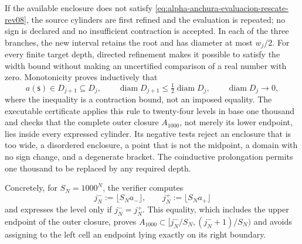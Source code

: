 If the available enclosure does not satisfy
\eqref{eq:alpha-anchura-evaluacion-rescate-rev08}, the source cylinders are
first refined and the evaluation is repeated; no sign is declared and no
insufficient contraction is accepted. In each of the three branches, the new
interval retains the root and has diameter at most \(w_j/2\). For every
finite target depth, directed refinement makes it possible to satisfy the
width bound without making an uncertified comparison of a real number with
zero. Monotonicity proves inductively that
\begin{equation}
 a(\mathsf s)\in D_{j+1}\subseteq D_j,\qquad
 \operatorname{diam}D_{j+1}\leq
 \tfrac12\operatorname{diam}D_j,
 \qquad \operatorname{diam}D_j\longrightarrow0,
 \label{eq:alpha-biseccion-racional}
\end{equation}
where the inequality is a contraction bound, not an imposed equality. The
executable certificate applies this rule to twenty-four levels in base one
thousand and checks that the complete outer closure \(A_{1000}\), not merely
its lower endpoint, lies inside every expressed cylinder. Its negative tests
reject an enclosure that is too wide, a disordered enclosure, a point that is
not the midpoint, a domain with no sign change, and a degenerate bracket. The
coinductive prolongation permits one thousand to be replaced by any required
depth.

Concretely, for \(S_N=1000^N\), the verifier computes
\begin{equation}
 j_N^-:=\lfloor S_Na_-\rfloor,
 \qquad j_N^+:=\lfloor S_Na_+\rfloor
 \label{eq:alpha-indices-cilindro-dirigidos-rev08}
\end{equation}
and expresses the level only if \(j_N^-=j_N^+\). This equality, which
includes the upper endpoint of the outer closure, proves
\(A_{1000}\subset[j_N^-/S_N,(j_N^-+1)/S_N)\) and avoids assigning to the
left cell an endpoint lying exactly on its right boundary.

